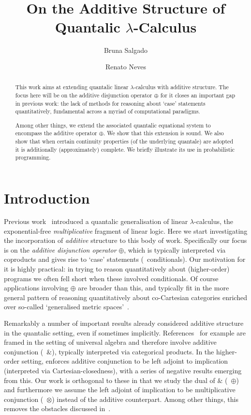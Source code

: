 \documentclass[a4paper,UKenglish,cleveref, autoref, thm-restate]{lipics-v2021}
\title{On the Additive Structure of Quantalic $\lambda$-Calculus} %
\author{Bruna Salgado}{University of Minho and INESC-TEC, Portugal }{johnqpublic@dummyuni.org}{https://orcid.org/0000-0002-1825-0097}{}%
\author{Renato Neves}{University of Minho and INESC-TEC, Portugal}{nevrenato@di.uminho.pt}{https://orcid.org/0000-0002-8787-2551}{}
\begin{document}
\maketitle

\begin{abstract}

This work aims at extending quantalic linear $\lambda$-calculus with additive
structure. The focus here will be on the additive disjunction operator $\oplus$
for it closes an important gap in previous work: the lack of methods for
reasoning about `case' statements  quantitatively, fundamental across a myriad
of computational paradigms. 

Among other things, we extend the associated quantalic equational system to
encompass the additive operator $\oplus$. We show that this extension is sound.
We also show that when certain continuity properties (of the underlying
quantale) are adopted it is additionally (approximately) complete. We briefly
illustrate its use in probabilistic programming.

\end{abstract}

\section{Introduction}
\label{sec:intro}

Previous work~\cite{dahlqvist22,dahlqvist2023syntactic} introduced a quantalic
generalisation of linear $\lambda$-calculus, the exponential-free
\emph{multiplicative} fragment of linear logic. Here we start investigating the
incorporation of \emph{additive} structure to this body of work. Specifically
our focus is on the \emph{additive disjunction operator} $\oplus$, which is
typically interpreted via coproducts and gives rise to `case' statements (\ie\
conditionals). Our motivation for it is highly practical: in trying to reason
quantitatively about (higher-order) programs we often fell short when these
involved conditionals. Of course applications involving $\oplus$ are broader
than this, and typically fit in the more general pattern of reasoning
quantitatively about co-Cartesian categories enriched over so-called
`generalised metric spaces'~\cite{paseka00}.

Remarkably a number of important results already considered additive structure
in the quantalic setting, even if sometimes implicitly.
References~\cite{mardare2016quantitative,mardare2017axiomatizability,mio24,jurka24}
for example are framed in the setting of universal algebra and therefore
involve additive conjunction (\ie\ $\&$), typically interpreted via categorical
products.  In the higher-order setting, \cite{lago22} enforces additive
conjunction to be left adjoint to implication (interpreted via
Cartesian-closedness), with a series of negative results emerging from this.
Our work is orthogonal to these in that we study the dual of $\&$ (\ie\
$\oplus$) and furthermore we assume the left adjoint of implication to be
multiplicative conjunction (\ie\ $\otimes$) instead of the additive
counterpart. Among other things, this removes the obstacles discussed
in~\cite{lago22}.
\end{document}
